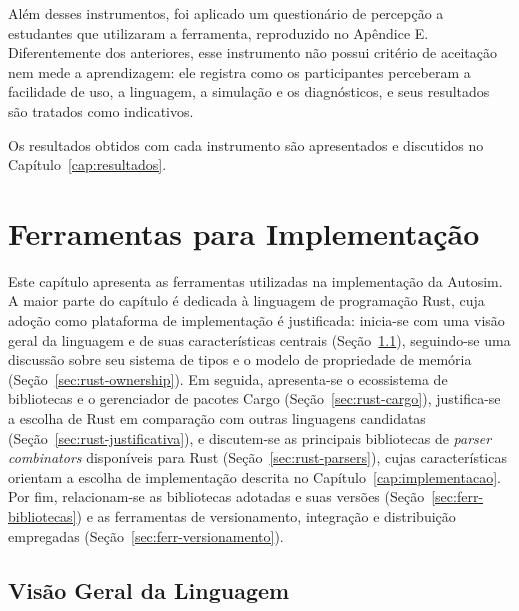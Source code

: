 \documentclass[
    12pt
    ,oneside
    ,a4paper
    ,chapter=TITLE
    ,section=TITLE
    ,sumario=abnt-6027-2012]{abntex2}
\begin{document}
Além desses instrumentos, foi aplicado um questionário de percepção a estudantes que
utilizaram a ferramenta, reproduzido no Apêndice E. Diferentemente dos anteriores, esse
instrumento não possui critério de aceitação nem mede a aprendizagem: ele registra como os
participantes perceberam a facilidade de uso, a linguagem, a simulação e os diagnósticos, e
seus resultados são tratados como indicativos.

Os resultados obtidos com cada instrumento são apresentados e discutidos no
Capítulo~\ref{cap:resultados}.

\chapter{Ferramentas para Implementação}
\label{cap:ferramentas}
Este capítulo apresenta as ferramentas utilizadas na implementação da Autosim. A maior parte
do capítulo é dedicada à linguagem de programação Rust, cuja adoção como plataforma de
implementação é justificada: inicia-se com uma visão geral da linguagem e de suas
características centrais (Seção~\ref{sec:rust-visao-geral}), seguindo-se uma discussão sobre
seu sistema de tipos e o modelo de propriedade de memória
(Seção~\ref{sec:rust-ownership}). Em seguida, apresenta-se o ecossistema de bibliotecas e o
gerenciador de pacotes Cargo (Seção~\ref{sec:rust-cargo}), justifica-se a escolha de Rust
em comparação com outras linguagens candidatas (Seção~\ref{sec:rust-justificativa}), e
discutem-se as principais bibliotecas de \textit{parser combinators} disponíveis para Rust
(Seção~\ref{sec:rust-parsers}), cujas características orientam a escolha de implementação
descrita no Capítulo~\ref{cap:implementacao}. Por fim, relacionam-se as bibliotecas adotadas
e suas versões (Seção~\ref{sec:ferr-bibliotecas}) e as ferramentas de versionamento,
integração e distribuição empregadas (Seção~\ref{sec:ferr-versionamento}).

\section{Visão Geral da Linguagem}
\label{sec:rust-visao-geral}
\end{document}
